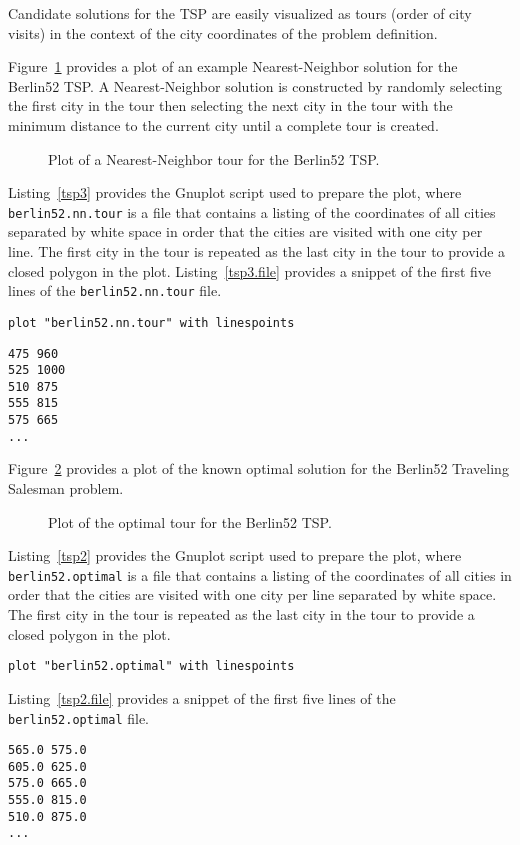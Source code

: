 Candidate solutions for the TSP are easily visualized as tours (order of city visits) in the context of the city coordinates of the problem definition.

Figure~\ref{plot:tsp3} provides a plot of an example Nearest-Neighbor solution for the Berlin52 TSP. A Nearest-Neighbor solution is constructed by randomly selecting the first city in the tour then selecting the next city in the tour with the minimum distance to the current city until a complete tour is created.

\begin{figure}[htp]
\centering

\caption{Plot of a Nearest-Neighbor tour for the Berlin52 TSP.}
\label{plot:tsp3}
\end{figure}

Listing~\ref{tsp3} provides the Gnuplot script used to prepare the plot, where \texttt{berlin52.nn.tour} is a file that contains a listing of the coordinates of all cities separated by white space in order that the cities are visited with one city per line. The first city in the tour is repeated as the last city in the tour to provide a closed polygon in the plot.
Listing~\ref{tsp3.file} provides a snippet of the first five lines of the \texttt{berlin52.nn.tour} file.

\begin{lstlisting}[caption=Gnuplot script for plotting a tour for a TSP., label=tsp3]
plot "berlin52.nn.tour" with linespoints
\end{lstlisting}

\begin{lstlisting}[caption=Snippet of the berlin52.nn.tour file., label=tsp3.file]
475 960
525 1000
510 875
555 815
575 665
...
\end{lstlisting}

Figure~\ref{plot:tsp2} provides a plot of the known optimal solution for the Berlin52 Traveling Salesman problem.

\begin{figure}[htp]
\centering

\caption{Plot of the optimal tour for the Berlin52 TSP.}
\label{plot:tsp2}
\end{figure}

Listing~\ref{tsp2} provides the Gnuplot script used to prepare the plot, where \texttt{berlin52.optimal} is a file that contains a listing of the coordinates of all cities in order that the cities are visited with one city per line separated by white space. The first city in the tour is repeated as the last city in the tour to provide a closed polygon in the plot.

\begin{lstlisting}[caption=Gnuplot script for plotting a tour for a TSP., label=tsp2]
plot "berlin52.optimal" with linespoints
\end{lstlisting}

Listing~\ref{tsp2.file} provides a snippet of the first five lines of the \texttt{berlin52.optimal} file.

\begin{lstlisting}[caption=Snippet of the \texttt{berlin52.optimal} file., label=tsp2.file]
565.0 575.0
605.0 625.0
575.0 665.0
555.0 815.0
510.0 875.0
...
\end{lstlisting}

